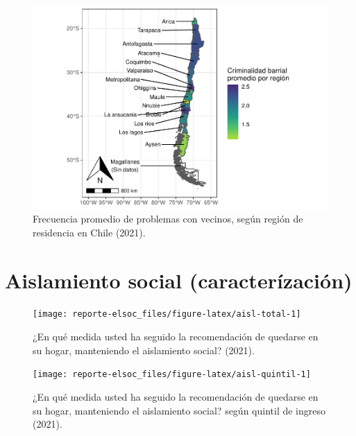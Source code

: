 \documentclass[
  12pt,
  openany]{book}
\begin{document}
\begin{figure}

{\centering \includegraphics{reporte-elsoc_files/figure-latex/confli-region-1} 

}

\caption{Frecuencia promedio de problemas con vecinos, según región de residencia en Chile (2021).}\label{fig:confli-region}
\end{figure}

\hypertarget{aislamiento-social-caracteruxedzaciuxf3n}{%
\section{Aislamiento social (caracterízación)}\label{aislamiento-social-caracteruxedzaciuxf3n}}

\begin{figure}

{\centering \texttt{[image: reporte-elsoc\_files/figure-latex/aisl-total-1]} 

}

\caption{¿En qué medida usted ha seguido la recomendación de quedarse en su hogar, manteniendo el aislamiento social? (2021).}\label{fig:aisl-total}
\end{figure}

\begin{figure}

{\centering \texttt{[image: reporte-elsoc\_files/figure-latex/aisl-quintil-1]} 

}

\caption{¿En qué medida usted ha seguido la recomendación de quedarse en su hogar, manteniendo el aislamiento social? según quintil de ingreso (2021).}\label{fig:aisl-quintil}
\end{figure}
\end{document}
